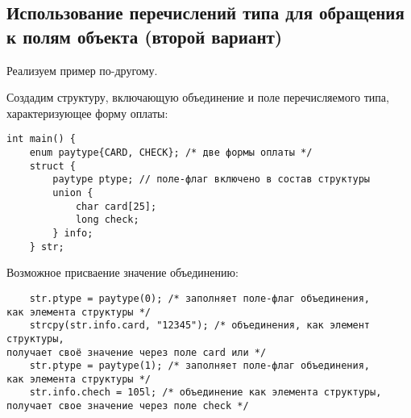 \subsection{Использование перечислений типа для обращения к полям объекта (второй вариант)}

Реализуем пример по-другому.

Создадим структуру, включающую объединение и поле перечисляемого типа, характеризующее форму оплаты:

\begin{verbatim}
int main() {
    enum paytype{CARD, CHECK}; /* две формы оплаты */
    struct {
        paytype ptype; // поле-флаг включено в состав структуры
        union {
            char card[25];
            long check;
        } info;
    } str;
\end{verbatim}

Возможное присваение значение объединению:

\begin{verbatim}
    str.ptype = paytype(0); /* заполняет поле-флаг объединения,
как элемента структуры */
    strcpy(str.info.card, "12345"); /* объединения, как элемент структуры,
получает своё значение через поле card или */
    str.ptype = paytype(1); /* заполняет поле-флаг объединения,
как элемента структуры */
    str.info.chech = 105l; /* объединение как элемента структуры,
получает свое значение через поле check */
\end{verbatim}